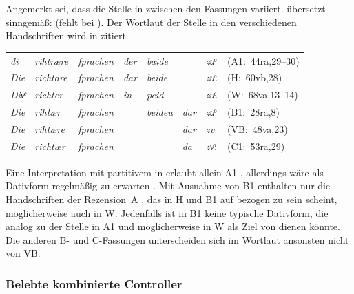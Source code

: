 Angemerkt sei, dass die Stelle in  zwischen den Fassungen
variiert. \citet[244]{myers2013} übersetzt sinngemäß:  (fehlt bei \cite[177--178]{mayer1874}).
Der Wortlaut der Stelle in den verschiedenen Handschriften wird in
 zitiert.

\begin{exe}
\ex \label{ex:gendassgmt2_var}
	\begin{tabular}[t]{
	@{}
	>{\itshape}l @{~}
	>{\itshape}l @{~}
	>{\itshape}l @{~}
	>{\itshape}l @{~}
	>{\itshape}l @{~}
	>{\itshape}l @{~}
	>{\itshape}l
	l
	@{}
}
di
	& rihtrære
	& ſprachen
	& der
	& baide
	& %
	& zuͦ
	& (A1:~44ra,29--30)
	\\

Die
	& richtare
	& ſprachen
	& dar
	& beide
	& %
	& zuͦ.
	& (H:~60vb,28)
	\\

Divͤ
	& richter
	& ſprachen
	& in
	& peid
	& %
	& zuͤ.
	& (W:~68va,13--14)
	\\

Die
	& rihtær
	& ſprachen
	& %
	& beideu
	& dar
	& zuͦ
	& (B1:~28ra,8)
	\\

Die
	& rihtære
	& ſprachen
	& %
	& %
	& dar
	& zv
	& (VB:~48va,23)
	\\

Die
	& richtær
	& ſprachen
	& %
	& %
	& da
	& zvͦ.
	& (C1:~53ra,29)
	\\
\end{tabular}
\end{exe}

Eine Interpretation mit partitivem  in   erlaubt allein A1
\autocite[vgl.][s.\,v.~\textit{zuo sprëchen}]{lexer:mhdhwb}, allerdings wäre
als Dativform regelmäßig  zu erwarten \autocite[182]{ksw2}. Mit
Ausnahme von B1 enthalten nur die Handschriften der Rezension~A ,
das in H und B1 auf   bezogen zu sein scheint,
möglicherweise auch in W. Jedenfalls ist  in B1 keine typische
Dativform, die analog zu der Stelle in A1 und möglicherweise in W als Ziel von
  dienen könnte. Die anderen B- und
C-Fassungen unterscheiden sich im Wortlaut ansonsten nicht von VB.


\largerpage
\subsubsection{Belebte kombinierte Controller}
\label{subsubsec:x+x_dir_anim}

